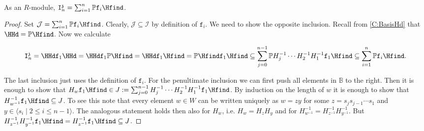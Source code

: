 \documentclass[a4paper,11pt]{amsart}
\numberwithin{equation}{subsection}
\theoremstyle{definition}
\theoremstyle{theorem}
\theoremstyle{remark}
\newcommand\charge{{\mathfrak{z}}}
\newcommand\Ic[1][n]{\mathtt{I}^\charge_{#1}}
\newcommand\Sym{W}
\newcommand\Poo{\mathbb{P}}
\newcommand{\Bo}{\mathbb{B}}
\begin{document}
\begin{Lemma}\label{peppermint}
As an $R$-module, $\Ic=\sum_{i=1}^n\Poo \mathtt{f}_i\Hfind$.
\end{Lemma}
\begin{proof}
Set $\mathcal{J}=\sum_{i=1}^n\Poo \mathtt{f}_i\Hfind$. Clearly, $ \mathcal{J}\subseteq  \mathcal{I}$ by definition of $\mathtt{f}_i$.  We need to show the opposite inclusion. Recall from  \autoref{C:BasisHd}  that $\HHd=\Poo\Hfind$. Now we calculate

\[\Ic=\HHd \mathtt{f}_1\HHd= \HHd \mathtt{f}_1 \Poo\Hfind =  \HHd \mathtt{f}_1 \Hfind =   \Poo\Hfind \mathtt{f}_1 \Hfind \subseteq \sum_{j=0}^{n-1} \Poo H_{j}^{-1}\cdots H_{2}^{-1}H_{1}^{-1} \mathtt{f}_1 \Hfind\subseteq \sum_{i=1}^n\Poo \mathtt{f}_i\Hfind.\]

The last inclusion just uses the definition of $\mathtt{f}_i$. For the  penultimate inclusion we can first  push all elements in $\Bo$ to the right. Then it is enough to show that $H_w\mathtt{f}_1 \Hfind \in J:=\sum_{j=0}^{n-1} H_{j}^{-1}\cdots H_{2}^{-1}H_{1}^{-1} \mathtt{f}_1 \Hfind$. By induction on the length of $w$ it is enough to show that $H_{w^{-1}}^{-1}\mathtt{f}_1 \Hfind\subseteq J$.
To see this note that every element $w\in\Sym$ can be written uniquely as $w=zy$ for some
${z=s_js_{j-1}\cdots s_1}$ and $y\in\langle s_i\mid 2\leq i\leq n-1\rangle$. The analogous statement holds then also for $H_w$, i.e. $H_w=H_{z
}H_y$ and for $H_{w^{-1}}^{-1}=H_{z^{-1}}^{-1}H_{y^{-1}}^{-1}$. But $H_{z^{-1}}^{-1}H_{y^{-1}}^{-1}\mathtt{f}_1\Hfind=H_{z^{-1}}^{-1}\mathtt{f}_1\Hfind\subseteq  J$.
\end{proof}
\end{document}
